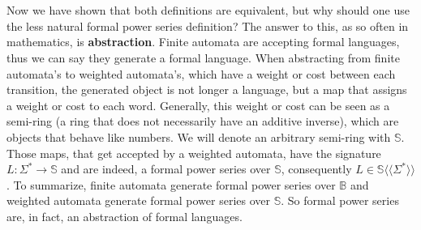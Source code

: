 \documentclass[12pt,letterpaper]{article}
\newcommand{\fps}[1] {
\mathbb{#1}\langle \langle \Sigma^* \rangle \rangle
}
\begin{document}
\\\\
Now we have shown that both definitions are equivalent, but why should one use the less natural formal power series definition? The answer to this, as so often in mathematics, is {\bf abstraction}. Finite automata are accepting formal languages, thus we can say they generate a formal language.
 When abstracting from finite automata's to weighted automata's, which have a weight or cost between each transition, the generated object is not longer a language, but a map that assigns a weight or cost to each word. 
Generally, this weight or cost can be seen as a semi-ring (a ring that does not necessarily have an additive inverse), which are objects that behave like numbers. We will denote an arbitrary
semi-ring with $\mathbb{S}$. Those maps, that get accepted by a weighted
automata, have the signature $L: \Sigma^* \to \mathbb{S}$ and are 
indeed, a formal power series over $\mathbb{S}$, consequently $L \in \fps{S}$.
To summarize, finite automata generate formal power series over $\mathbb{B}$
and weighted automata generate formal power series over $\mathbb{S}$. So  formal power series are, in fact, an abstraction of formal languages.
\end{document}
